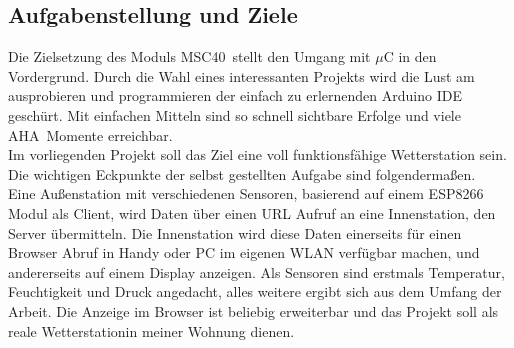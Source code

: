 \documentclass[12pt,a4paper]{scrartcl}	%
\begin{document}
\subsection{Aufgabenstellung und Ziele}
Die Zielsetzung des Moduls \glqq MSC40\grqq~stellt den Umgang mit $\mu$C in den Vordergrund. Durch die Wahl eines interessanten Projekts wird die Lust am ausprobieren und programmieren der einfach zu erlernenden Arduino IDE geschürt. Mit einfachen Mitteln sind so schnell sichtbare Erfolge und viele \glqq AHA\grqq~Momente erreichbar.\\
Im vorliegenden Projekt soll das Ziel eine voll funktionsfähige Wetterstation sein. Die wichtigen Eckpunkte der selbst gestellten Aufgabe sind folgendermaßen.\\
Eine Außenstation mit verschiedenen Sensoren, basierend auf einem ESP8266 Modul als Client, wird Daten über einen URL Aufruf an eine Innenstation, den Server übermitteln. Die Innenstation wird diese Daten einerseits für einen Browser Abruf in Handy oder PC im eigenen WLAN verfügbar machen, und andererseits auf einem Display anzeigen.
Als Sensoren sind erstmals Temperatur, Feuchtigkeit und Druck angedacht, alles weitere ergibt sich aus dem Umfang der Arbeit. Die Anzeige im Browser ist beliebig erweiterbar und das Projekt soll als reale \glqq Wetterstation\grqq in meiner Wohnung dienen.
\end{document}
